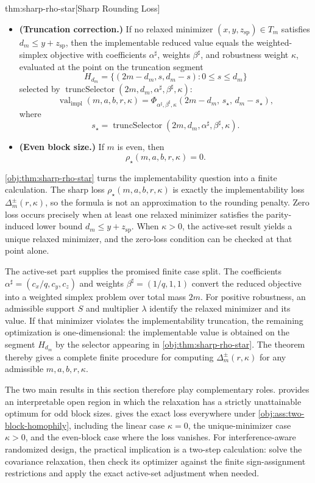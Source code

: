 \documentclass[11pt]{article}
\begin{document}
\begin{theoremv}{thm:sharp-rho-star}[Sharp Rounding Loss]
\begin{itemize}
\item \textbf{(Truncation correction.)}
If no relaxed minimizer $(x,y,z_{\mathrm{sp}})\in T_m$ satisfies $d_m\le y+z_{\mathrm{sp}}$, then the implementable reduced value equals the weighted-simplex objective with coefficients $\alpha^\sharp$, weights $\beta^\sharp$, and robustness weight $\kappa$, evaluated at the point on the truncation segment
\[
H_{d_m}=\{(2m-d_m,s,d_m-s):0\le s\le d_m\}
\]
selected by $\operatorname{truncSelector}(2m,d_m,\alpha^\sharp,\beta^\sharp,\kappa)$:
\[
\operatorname{val}_{\mathrm{impl}}(m,a,b,r,\kappa)
=
\Phi_{\alpha^\sharp,\beta^\sharp,\kappa}
\!\left(
2m-d_m,\,
s_\star,\,
d_m-s_\star
\right),
\]
where
\[
s_\star=\operatorname{truncSelector}(2m,d_m,\alpha^\sharp,\beta^\sharp,\kappa).
\]

\item \textbf{(Even block size.)}
If $m$ is even, then
\[
\rho_\star(m,a,b,r,\kappa)=0.
\]
\end{itemize}
\end{theoremv}

\cref{obj:thm:sharp-rho-star} turns the implementability question into a finite calculation. The sharp loss \ensuremath{\rho_\star(m,a,b,r,\kappa)} is exactly the implementability loss \(\Delta_m^{\pm}(r,\kappa)\), so the formula is not an approximation to the rounding penalty. Zero loss occurs precisely when at least one relaxed minimizer satisfies the parity-induced lower bound \(d_m\le y+z_{\mathrm{sp}}\). When \(\kappa>0\), the active-set result yields a unique relaxed minimizer, and the zero-loss condition can be checked at that point alone.

The active-set part supplies the promised finite case split. The coefficients \(\alpha^\sharp=(c_x/q,c_y,c_z)\) and weights \(\beta^\sharp=(1/q,1,1)\) convert the reduced objective into a weighted simplex problem over total mass \(2m\). For positive robustness, an admissible support \(S\) and multiplier \(\lambda\) identify the relaxed minimizer and its value. If that minimizer violates the implementability truncation, the remaining optimization is one-dimensional: the implementable value is obtained on the segment \(H_{d_m}\) by the selector appearing in \cref{obj:thm:sharp-rho-star}. The theorem thereby gives a complete finite procedure for computing \(\Delta_m^{\pm}(r,\kappa)\) for any admissible \(m,a,b,r,\kappa\).

The two main results in this section therefore play complementary roles.  provides an interpretable open region in which the relaxation has a strictly unattainable optimum for odd block sizes.  gives the exact loss everywhere under \cref{obj:ass:two-block-homophily}, including the linear case \(\kappa=0\), the unique-minimizer case \(\kappa>0\), and the even-block case where the loss vanishes. For interference-aware randomized design, the practical implication is a two-step calculation: solve the covariance relaxation, then check its optimizer against the finite sign-assignment restrictions and apply the exact active-set adjustment when needed.
\end{document}
